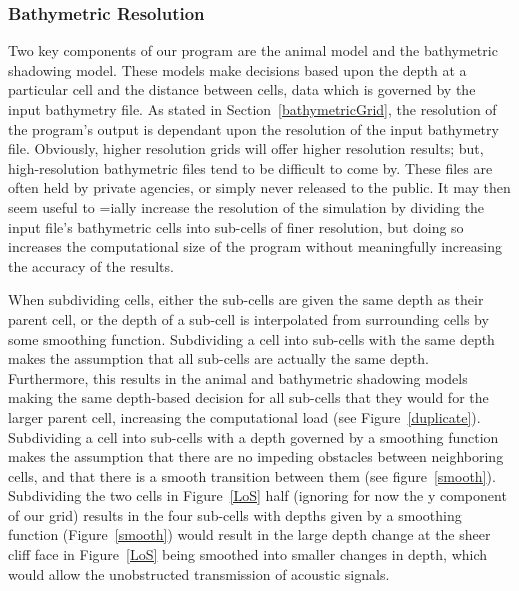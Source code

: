 \subsubsection{Bathymetric Resolution}
Two key components of our program are the animal model and the bathymetric shadowing model.  These models make decisions based upon the depth at a particular cell and the distance between cells, data which is governed by the input bathymetry file.  As stated in Section~\ref{bathymetricGrid}, the resolution of the program's output is dependant upon the resolution of the input bathymetry file.  Obviously, higher resolution grids will offer higher resolution results; but, high-resolution bathymetric files tend to be difficult to come by.  These files are often held by private agencies, or simply never released to the public.  It may then seem useful to =ially increase the resolution of the simulation by dividing the input file's bathymetric cells into sub-cells of finer resolution, but doing so increases the computational size of the program without meaningfully increasing the accuracy of the results.    
 
 
When subdividing cells, either the sub-cells are given the same depth as their parent cell, or the depth of a sub-cell is interpolated from surrounding cells by some smoothing function.  Subdividing a cell into sub-cells with the same depth makes the assumption that all sub-cells are actually the same depth.  Furthermore, this results in the animal and bathymetric shadowing models making the same depth-based decision for all sub-cells that they would for the larger parent cell, increasing the computational load (see Figure~\ref{duplicate}).  Subdividing a cell into sub-cells with a depth governed by a smoothing function makes the assumption that there are no impeding obstacles between neighboring cells, and that there is a smooth transition between them (see figure~\ref{smooth}).  Subdividing the two cells in Figure~\ref{LoS} half (ignoring for now the y component of our grid) results in the four sub-cells with depths given by a smoothing function (Figure~\ref{smooth}) would result in the large depth change at the sheer cliff face in Figure~\ref{LoS} being smoothed into smaller changes in depth, which would allow the unobstructed transmission of acoustic signals.


